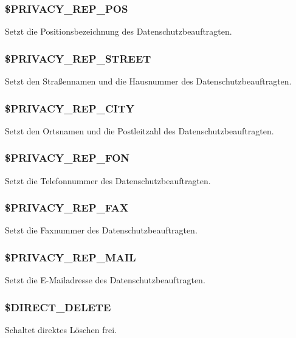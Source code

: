 \subsubsection{\$PRIVACY\_REP\_POS} Setzt die Positionsbezeichnung des Datenschutzbeauftragten.
\subsubsection{\$PRIVACY\_REP\_STREET} Setzt den Straßennamen und die Hausnummer des Datenschutzbeauftragten.
\subsubsection{\$PRIVACY\_REP\_CITY} Setzt den Ortsnamen und die Postleitzahl des Datenschutzbeauftragten.
\subsubsection{\$PRIVACY\_REP\_FON} Setzt die Telefonnummer des Datenschutzbeauftragten.
\subsubsection{\$PRIVACY\_REP\_FAX} Setzt die Faxnummer des Datenschutzbeauftragten.
\subsubsection{\$PRIVACY\_REP\_MAIL} Setzt die E-Mailadresse des Datenschutzbeauftragten.
\subsubsection{\$DIRECT\_DELETE} Schaltet direktes Löschen frei.
